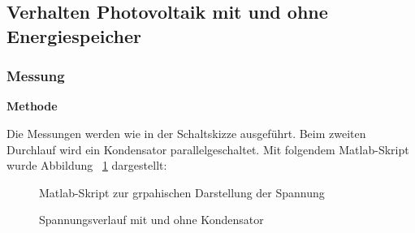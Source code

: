 \subsection {Verhalten Photovoltaik mit und ohne Energiespeicher}   %
    \subsubsection{Messung}                                             %
        \textbf{Methode}
        \newline
        \par Die Messungen werden wie in der Schaltskizze ausgeführt. Beim zweiten Durchlauf wird ein Kondensator parallelgeschaltet. Mit folgendem Matlab-Skript wurde Abbildung ~\ref{fig:matlab_langzeit_kondensator} dargestellt:
        
        \begin{figure}[h]
            
            \caption{Matlab-Skript zur grpahischen Darstellung der Spannung}
            \label{fig:matlab_langzeit_kondensator}
        \end{figure}

        
        \begin{figure}[H]
            \def\svgwidth{\textwidth}
               
            \caption{Spannungsverlauf mit und ohne Kondensator}
    \end{figure}
        
